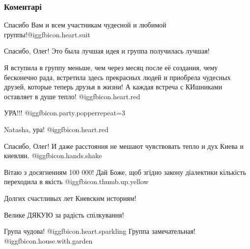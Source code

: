  
 
 
 
 
\subsubsection{Коментарі}
\label{sec:10_10_2021.fb.fb_group.story_kiev_ua.1.gruppa.cmt}

\begin{itemize} %
Спасибо Вам и всем участникам чудесной и любимой группы!@igg{fbicon.heart.suit}


Спасибо, Олег! Это была лучшая идея и группа получилась лучшая!

Я вступила в группу меньше, чем через месяц после её создания, чему бесконечно
рада, встретила здесь прекрасных людей и приобрела чудесных
друзей, которые теперь друзья в жизни! А каждая встреча с
КИшниками оставляет в душе тепло! @igg{fbicon.heart.red}

УРА!!!  @igg{fbicon.party.popper}{repeat=3} 

\begin{itemize} %


Natasha, ура! @igg{fbicon.heart.red}
\end{itemize} %

Спасибо, Олег! И даже расстояния не мешают чувствовать тепло и дух Киева и киевлян.  @igg{fbicon.hands.shake} 

Вітаю з досягненням 100 000! Дай Боже, щоб згідно закону діалектики кількість переходила в якість @igg{fbicon.thumb.up.yellow} 

Долгих счастливых лет Киевским историям!

Велике ДЯКУЮ за радість спілкування!

Група чудова! @igg{fbicon.heart.sparkling}  Группа замечательная! @igg{fbicon.house.with.garden} 


\end{itemize}
